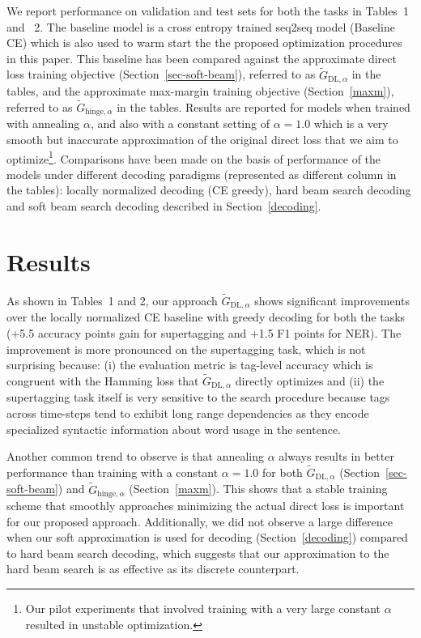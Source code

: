 \documentclass[letterpaper]{article} \usepackage{aaai18}  \usepackage{times}  \usepackage{helvet}  \usepackage{courier}  \usepackage{url}  \usepackage{graphicx}  \frenchspacing
\begin{document}
We report performance on validation and test sets for both the tasks in Tables~1 and ~2. The baseline model is a cross entropy trained seq2seq model (Baseline CE) which is also used to warm start the the proposed optimization procedures in this paper. This baseline has been compared against the approximate direct loss training objective (Section~\ref{sec-soft-beam}), referred to as $\tilde{G}_{\textrm{DL},\alpha}$ in the tables, and the approximate max-margin training objective (Section~\ref{maxm}), referred to as $\tilde{G}_{\textrm{hinge},\alpha}$ in the tables. Results are reported for models when trained with annealing $\alpha$, and also with a constant setting of $\alpha=1.0$ which is a very smooth but inaccurate approximation of the original direct loss that we aim to optimize\footnote{Our pilot experiments that involved training with a very large constant $\alpha$ resulted in unstable optimization.}. Comparisons have been made on the basis of performance of the models under different decoding paradigms (represented as different column in the tables): locally normalized decoding (CE greedy), hard beam search decoding and soft beam search decoding described in Section~\ref{decoding}.
\section{Results}
\label{results}
As shown in Tables~1 and 2, our approach $\tilde{G}_{\textrm{DL},\alpha}$ shows significant improvements over the locally normalized CE baseline with greedy decoding for both the tasks (+5.5 accuracy points gain for supertagging and +1.5 F1 points for NER). The improvement is more pronounced on the supertagging task, which is not surprising because: (i) the evaluation metric is tag-level accuracy which is congruent with the Hamming loss that $\tilde{G}_{\textrm{DL},\alpha}$ directly optimizes and (ii) the supertagging task itself is very sensitive to the search procedure because tags across time-steps tend to exhibit long range dependencies as they encode specialized syntactic information about word usage in the sentence. 

Another common trend to observe is that annealing $\alpha$ always results in better performance than training with a constant $\alpha=1.0$ for both $\tilde{G}_{\textrm{DL},\alpha}$ (Section~\ref{sec-soft-beam}) and $\tilde{G}_{\textrm{hinge},\alpha}$ (Section~\ref{maxm}). This shows that a stable training scheme that smoothly approaches minimizing the actual direct loss is important for our proposed approach. Additionally, we did not observe a large difference when our soft approximation is used for decoding (Section~\ref{decoding}) compared to hard beam search decoding, which suggests that our approximation to the hard beam search is as effective as its discrete counterpart.
\end{document}
